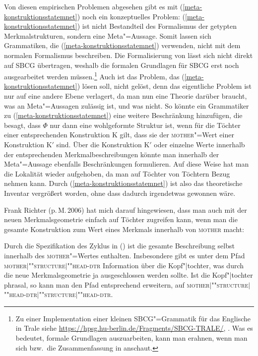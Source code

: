 Von diesen empirischen Problemen abgesehen gibt es mit (\ref{meta-konstruktionsstatemnet}) noch ein konzeptuelles Problem:
(\ref{meta-konstruktionsstatemnet}) ist nicht Bestandteil des Formalismus der getypten Merkmalstrukturen, sondern eine
Meta"=Aussage. Somit lassen sich Grammatiken, die (\ref{meta-konstruktionsstatemnet}) verwenden, 
nicht mit dem normalen Formalismus beschreiben. Die Formalisierung von \citet{Richter2004a-u} lässt sich
nicht direkt auf SBCG übertragen, weshalb die formalen Grundlagen für SBCG erst noch
ausgearbeitet werden müssen.\footnote{%
Zu einer Implementation einer kleinen SBCG"=Grammatik für das Englische in Trale siehe
\url{https://hpsg.hu-berlin.de/Fragments/SBCG-TRALE/}, \mytoday. Was es bedeutet, formale Grundlagen
auszuarbeiten, kann man erahnen, wenn man sich  bzw.\ die Zusammenfassung in
 anschaut.
}
Auch ist das Problem, das (\ref{meta-konstruktionsstatemnet}) lösen soll, nicht gelöst, denn
das eigentliche Problem ist nur auf eine andere Ebene verlagert, da man nun eine Theorie
darüber braucht, was an Meta"=Aussagen zulässig ist, und was nicht. So könnte ein Grammatiker zu (\ref{meta-konstruktionsstatemnet})
eine weitere Beschränkung hinzufügen, die besagt, dass $\Phi$ nur dann eine wohlgeformte Struktur
ist, wenn für die Töchter einer entsprechenden Konstruktion K gilt, dass sie der \textsc{mother}"=Wert
einer Konstruktion K$'$ sind. Über die Konstruktion K$'$ oder einzelne Werte innerhalb der entsprechenden
Merkmalbeschreibungen könnte man innerhalb der Meta"=Aussage ebenfalls Beschränkungen formulieren.
Auf diese Weise hat man die Lokalität wieder aufgehoben, da man auf Töchter von Töchtern Bezug nehmen kann.
Durch (\ref{meta-konstruktionsstatemnet}) ist also das theoretische Inventar vergrößert worden,
ohne dass dadurch irgendetwas gewonnen wäre.


Frank Richter (p.\,M.\,2006) hat mich darauf hingewiesen, dass man auch mit
der neuen Merkmalsgeometrie einfach auf Töchter zugreifen kann, wenn man die gesamte Konstruktion
zum Wert eines Merkmals innerhalb von \textsc{mother} macht:

\ea
{} 
\z
Durch die Spezifikation des Zyklus in () ist die gesamte Beschreibung selbst innerhalb des
\textsc{mother}"=Wertes enthalten. Insbesondere gibt es unter dem Pfad
\textsc{mother$|$""struc\-ture$|$""head-dtr} Information über die Kopf"|tochter, was durch die neue 
Merkmalsgeometrie ja ausgeschlossen werden sollte. Ist die Kopf"|tochter phrasal, so kann man den Pfad
entsprechend erweitern, \zb auf  \textsc{mother$|$""struc\-ture$|$""head-dtr$|$""struc\-ture$|$""head-dtr}.

